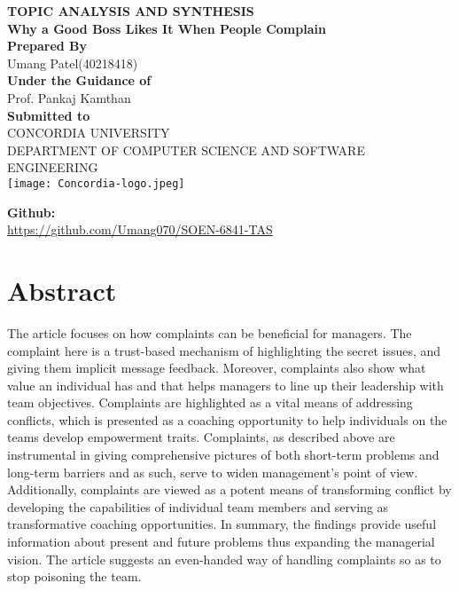 \documentclass[a4paper,12pt]{report}
\begin{document}
\begin{titlepage}
   \begin{center}
       \vspace*{-8ex}
        \begin{figure}[h!]
  \centering
\end{figure}

       \textbf{\large TOPIC ANALYSIS AND SYNTHESIS }\\[0.3in]
        \textbf{\large Why a Good Boss Likes It When People Complain} \\ [0.3in]
        \textbf{\large Prepared By} \\[0.1in]
        \normal Umang Patel(40218418)\\[0.3in]
       

        \textbf{\large Under the Guidance of}\\[0.15in]
        \normal Prof. Pankaj Kamthan\\[0.4in]

        \textbf{\large Submitted to}\\[0.15in]
        \normal CONCORDIA UNIVERSITY\\[0.05in]
        \normal DEPARTMENT OF COMPUTER SCIENCE AND SOFTWARE ENGINEERING\\[0.2in]
        \texttt{[image: Concordia-logo.jpeg]}

       \vspace{1.0cm}
      
        \textbf{Github:}\\\url{https://github.com/Umang070/SOEN-6841-TAS}\\[0.2in]
    
       \vfill
   \end{center}
\end{titlepage}

\tableofcontents
\chapter {Abstract}


The article focuses on how complaints can be beneficial for managers. The complaint here is a trust-based mechanism of highlighting the secret issues, and giving them implicit message feedback. Moreover, complaints also show what value an individual has and that helps managers to line up their leadership with team objectives. Complaints are highlighted as a vital means of addressing conflicts, which is presented as a coaching opportunity to help individuals on the teams develop empowerment traits. Complaints, as described above are instrumental in giving comprehensive pictures of both short-term problems and long-term barriers and as such, serve to widen management's point of view. Additionally, complaints are viewed as a potent means of transforming conflict by developing the capabilities of individual team members and serving as transformative coaching opportunities. In summary, the findings provide useful information about present and future problems thus expanding the managerial vision. The article suggests an even-handed way of handling complaints so as to stop poisoning the team.
\end{document}
